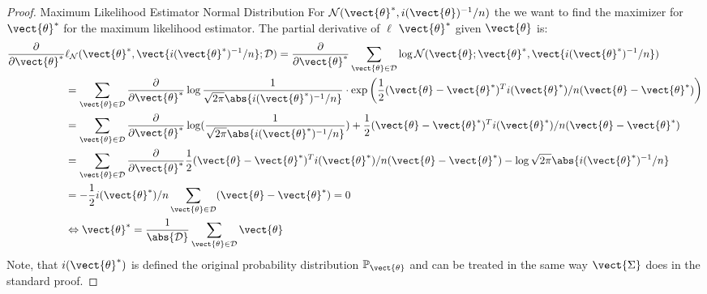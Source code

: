 \begin{proof}{Maximum Likelihood Estimator Normal Distribution}
    For $\mathcal{N}(\vect{\theta}^*, i(\vect{\theta})^{-1}/n)$ the we want to find the maximizer for $\vect{\theta}^*$ for the maximum likelihood estimator. 
    The partial derivative of $\ell$ \wrt $\vect{\theta}^*$ given $\vect{\theta}$ is:
    \begin{equation}
        \begin{split}
        \frac{\partial}{\partial \vect{\theta}^*}&\ell_{\mathcal{N}}(\vect{\theta}^*, \vect{i(\vect{\theta}^*)^{-1}/n}; \mathcal{D}) =  \frac{\partial}{\partial \vect{\theta}^*} \sum_{\vect{\theta} \in \mathcal{D}} \log \mathcal{N}(\vect{\theta}; \vect{\theta}^*, \vect{i(\vect{\theta}^*)^{-1}/n})\\
        &=  \sum_{\vect{\theta} \in \mathcal{D}} \frac{\partial}{\partial \vect{\theta}^*} \log \frac{1}{\sqrt{2 \pi} \abs{i(\vect{\theta}^*)^{-1}/n}} \cdot \exp\bigg(\frac{1}{2} (\vect{\theta} - \vect{\theta}^*)^Ti(\vect{\theta}^*)/n(\vect{\theta} - \vect{\theta}^*) \bigg) \\
        &=  \sum_{\vect{\theta} \in \mathcal{D}} \frac{\partial}{\partial \vect{\theta}^*} \log (\frac{1}{\sqrt{2 \pi} \abs{i(\vect{\theta}^*)^{-1}/n}}) + \frac{1}{2} (\vect{\theta} - \vect{\theta}^*)^Ti(\vect{\theta}^*)/n(\vect{\theta} - \vect{\theta}^*) \\
        &=  \sum_{\vect{\theta} \in \mathcal{D}} \frac{\partial}{\partial \vect{\theta}^*} \frac{1}{2} (\vect{\theta} - \vect{\theta}^*)^Ti(\vect{\theta}^*)/n(\vect{\theta} - \vect{\theta}^*) - \log \sqrt{2 \pi} \abs{i(\vect{\theta}^*)^{-1}/n} \\
        &= - \frac{1}{2} i(\vect{\theta}^*)/n \sum_{\vect{\theta} \in \mathcal{D}} (\vect{\theta} - \vect{\theta}^*) = 0 \\
        &\Leftrightarrow \vect{\theta}^* = \frac{1}{\abs{\mathcal{D}}} \sum_{\vect{\theta} \in \mathcal{D}}  \vect{\theta}
        \end{split}
    \end{equation}
    Note, that $i(\vect{\theta}^*)$ is defined \wrt the original probability distribution $\mathbb{P}_{\vect{\theta}}$ and can be treated in the same way $\vect{\Sigma}$ does in the standard proof.
\end{proof}



